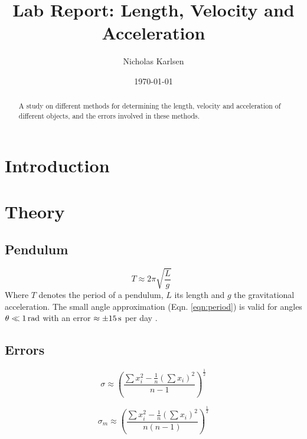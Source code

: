 \documentclass[11pt,a4paper]{article}
\begin{document}

\title{Lab Report: Length, Velocity and Acceleration}%

\author{Nicholas Karlsen}

\date{\today}%

\maketitle

\begin{abstract}
  A study on different methods for determining the length, velocity and acceleration of different objects, and the errors involved in these methods.
\end{abstract}
\section{\label{sec:intro}Introduction}

\section{\label{sec:theory}Theory}
  \subsection{Pendulum}
    \begin{equation}
      \label{eqn:period}
        T \approx 2\pi \sqrt{\frac{L}{g}}\enspace
    \end{equation}
    Where $T$ denotes the period of a pendulum, $L$ its length and $g$ the gravitational acceleration. The small angle approximation (Eqn. \ref{eqn:period})  is valid for angles $\theta \ll 1\, \textup{rad}$ with an error $\approx \pm 15 \, \textup{s}$ per day \cite{pend_wik}.
  \subsection{Errors}
    \begin{equation}
    \label{eqn:sigma}
      \sigma \approx \left(
      \frac{\sum x_i^2 - \frac{1}{n}(\sum x_i)^2}
      {n - 1}
      \right)^\frac{1}{2}
    \end{equation}
    
    \begin{equation}
      \label{eqn:sigma_m}
      \sigma_m \approx \left(
      \frac{\sum x_i^2 - \frac{1}{n}(\sum x_i)^2}
      {n(n - 1)}
      \right)^\frac{1}{2}
    \end{equation}
\end{document}
